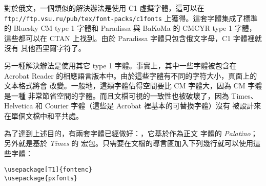 對於俄文，一個類似的解決辦法是使用 C1 虛擬字體，這可以在 \texttt{ftp://ftp.vsu.ru/pub/tex/font-packs/c1fonts} 
上獲得。這套字體集成了標準的 Bluesky CM type 1 字體和 Paradissa 
與 BaKoMa 的 CMCYR
type 1 字體，這些都可以在 CTAN 上找到。由於 Paradissa 字體只包含俄文字母，C1 字體裡就沒有
其他西里爾字符了。


另一種解決辦法是使用其它 \PSi{}
type 1 字體。事實上，其中一些字體被包含在 Acrobat
Reader 的相應語言版本中。由於這些字體有不同的字符大小，頁面上的文本格式將會
改變。一般地，這類字體佔得空間要比 CM 字體大，因為 CM 字體是一種
非常節省空間的字體。而且文檔可視的一致性也被破壞了，因為 Times、
Helvetica 和 Courier 字體（這些是 Acrobat 裡基本的可替換字體）沒有
被設計來在單個文檔中和平共處。


為了達到上述目的，有兩套字體已經做好：，它基於作為正文
字體的 \emph{Palatino}；另外就是基於 \emph{Times} 的  宏包。只需要在文檔的導言區加入下列幾行就可以使用這些字體：
\begin{code}
\begin{verbatim}
\usepackage[T1]{fontenc}
\usepackage{pxfonts}
\end{verbatim}
\end{code}


